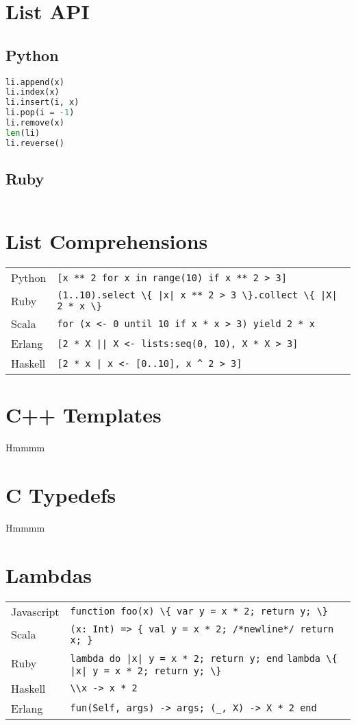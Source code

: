 \documentclass{article}
\begin{document}
\section{List API}
\subsection{Python}
\begin{lstlisting}[language=Python]
li.append(x)
li.index(x)
li.insert(i, x)
li.pop(i = -1)
li.remove(x)
len(li)
li.reverse()
\end{lstlisting}

\subsection{Ruby}
\begin{lstlisting}[language=Ruby]

\end{lstlisting}

\section{List Comprehensions}
\begin{longtabu} to 0.75\linewidth { X X }
	Python & \lstinline$[x ** 2 for x in range(10) if x ** 2 > 3]$ \\
	Ruby & \lstinline$(1..10).select \{ |x| x ** 2 > 3 \}.collect \{ |X| 2 * x \}$ \\
	Scala & \lstinline$for (x <- 0 until 10 if x * x > 3) yield 2 * x$ \\
	Erlang & \lstinline$[2 * X || X <- lists:seq(0, 10), X * X > 3]$ \\
	Haskell & \lstinline$[2 * x | x <- [0..10], x ^ 2 > 3]$ \\
\end{longtabu}

\section{C++ Templates}
Hmmmm

\section{C Typedefs}
Hmmmm

\section{Lambdas}
\begin{longtabu} to 0.75\linewidth { X X }
	Javascript & \lstinline$function foo(x) \{ var y = x * 2; return y; \}$ \\
	Scala & \lstinline$(x: Int) => { val y = x * 2; /*newline*/ return x; }$ \\
	Ruby & \lstinline$lambda do |x| y = x * 2; return y; end$ \newline \lstinline$lambda \{ |x| y = x * 2; return y; \}$ \\
	Haskell & \lstinline$\\x -> x * 2$ \\
	Erlang & \lstinline$fun(Self, args) -> args; (_, X) -> X * 2 end$
\end{longtabu}
\end{document}

